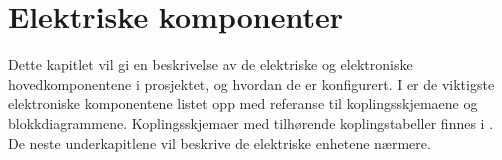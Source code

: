\documentclass[Visionprosjekt.tex]{subfiles}
\begin{document}
 

\section{Elektriske komponenter}

Dette kapitlet vil gi en  beskrivelse av de elektriske og elektroniske hovedkomponentene i prosjektet, og hvordan de er konfigurert.
I  er de viktigste elektroniske komponentene listet opp med referanse til koplingsskjemaene og blokkdiagrammene. Koplingsskjemaer med tilhørende  koplingstabeller finnes i .
De neste underkapitlene vil beskrive de elektriske enhetene nærmere.

%
\end{document}
